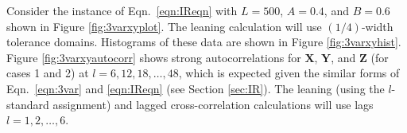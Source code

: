 Consider the instance of Eqn.\ \ref{eqn:IReqn} with $L=500$, $A=0.4$, and $B=0.6$ shown in Figure \ref{fig:3varxyplot}.  The leaning calculation will use $(1/4)$-width tolerance domains.  Histograms of these data are shown in Figure \ref{fig:3varxyhist}.  Figure \ref{fig:3varxyautocorr} shows strong autocorrelations for $\mathbf{X}$, $\mathbf{Y}$, and $\mathbf{Z}$ (for cases 1 and 2) at $l=6,12,18,\ldots,48$, which is expected given the similar forms of Eqn.\ \ref{eqn:3var} and \ref{eqn:IReqn} (see Section \ref{sec:IR}).  The leaning (using the $l$-standard assignment) and lagged cross-correlation calculations will use lags $l=1,2,\ldots,6$.  
